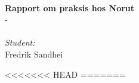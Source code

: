 \documentclass[12pt, a4paper]{article}
\begin{document}
\begin{titlepage}

\HRule \\[0.4cm]
{ \huge \bfseries Rapport om praksis hos Norut}\\[0.4cm] %
{\large {} \hspace{1cm} - \hspace{1cm}}\\[.55cm] %
\HRule \\[1.5cm]
 

\Large \emph{Student:}\\
Fredrik Sandhei\\[3cm] %

 

\vfill %

\end{titlepage}
\date{\today}
<<<<<<< HEAD
\newpage
\tableofcontents
\newpage
=======
\maketitle
\clearpage
\end{document}

